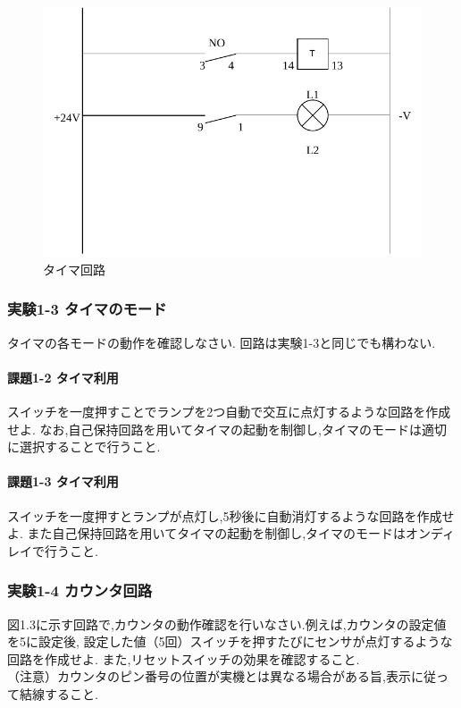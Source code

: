 \begin{figure}[H]
  \centering
  \includegraphics[scale=0.5]{sozai/2.pdf}
  \caption{タイマ回路}
\end{figure}

\subsubsection{実験1-3 タイマのモード}
タイマの各モードの動作を確認しなさい.
回路は実験1-3と同じでも構わない.

\paragraph{課題1-2 タイマ利用}
スイッチを一度押すことでランプを2つ自動で交互に点灯するような回路を作成せよ.
なお,自己保持回路を用いてタイマの起動を制御し,タイマのモードは適切に選択することで行うこと.\\

\paragraph{課題1-3 タイマ利用}
スイッチを一度押すとランプが点灯し,5秒後に自動消灯するような回路を作成せよ.
また自己保持回路を用いてタイマの起動を制御し,タイマのモードはオンディレイで行うこと.\\

\subsubsection{実験1-4 カウンタ回路}
図1.3に示す回路で,カウンタの動作確認を行いなさい.例えば,カウンタの設定値を5に設定後,
設定した値（5回）スイッチを押すたびにセンサが点灯するような回路を作成せよ.
また,リセットスイッチの効果を確認すること.\\
（注意）カウンタのピン番号の位置が実機とは異なる場合がある旨,表示に従って結線すること.

